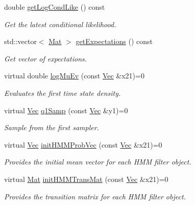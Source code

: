 \begin{DoxyCompactItemize}
double \hyperlink{classHmm__Rbpf_a39ddb0a59bce678e13fc04f2b394c36d}{get\+Log\+Cond\+Like} () const 
\begin{DoxyCompactList}\small\item\em Get the latest conditional likelihood. \end{DoxyCompactList}\item 
std\+::vector$<$ \hyperlink{apf__filter_8h_ae601f56a556993079f730483c574356f}{Mat} $>$ \hyperlink{classHmm__Rbpf_a4e8cd1a8d1d56e70cf2eee2f24925953}{get\+Expectations} () const 
\begin{DoxyCompactList}\small\item\em Get vector of expectations. \end{DoxyCompactList}\item 
virtual double \hyperlink{classHmm__Rbpf_aecfbf4f24599accbf2bbda77de8d1b99}{log\+Mu\+Ev} (const \hyperlink{apf__filter_8h_a4c7df05c6f5e8a0d15ae14bcdbc07152}{Vec} \&x21)=0
\begin{DoxyCompactList}\small\item\em Evaluates the first time state density. \end{DoxyCompactList}\item 
virtual \hyperlink{apf__filter_8h_a4c7df05c6f5e8a0d15ae14bcdbc07152}{Vec} \hyperlink{classHmm__Rbpf_a95f6f299b49e8c47993fab2772a517b4}{q1\+Samp} (const \hyperlink{apf__filter_8h_a4c7df05c6f5e8a0d15ae14bcdbc07152}{Vec} \&y1)=0
\begin{DoxyCompactList}\small\item\em Sample from the first sampler. \end{DoxyCompactList}\item 
virtual \hyperlink{apf__filter_8h_a4c7df05c6f5e8a0d15ae14bcdbc07152}{Vec} \hyperlink{classHmm__Rbpf_a22bf131a47a9e96e39b6bbb5f60e597d}{init\+H\+M\+M\+Prob\+Vec} (const \hyperlink{apf__filter_8h_a4c7df05c6f5e8a0d15ae14bcdbc07152}{Vec} \&x21)=0
\begin{DoxyCompactList}\small\item\em Provides the initial mean vector for each H\+MM filter object. \end{DoxyCompactList}\item 
virtual \hyperlink{apf__filter_8h_ae601f56a556993079f730483c574356f}{Mat} \hyperlink{classHmm__Rbpf_a455f785b1283acce5e01a80c58dd350d}{init\+H\+M\+M\+Trans\+Mat} (const \hyperlink{apf__filter_8h_a4c7df05c6f5e8a0d15ae14bcdbc07152}{Vec} \&x21)=0
\begin{DoxyCompactList}\small\item\em Provides the transition matrix for each H\+MM filter object. \end{DoxyCompactList}\item 

\end{DoxyCompactItemize}
